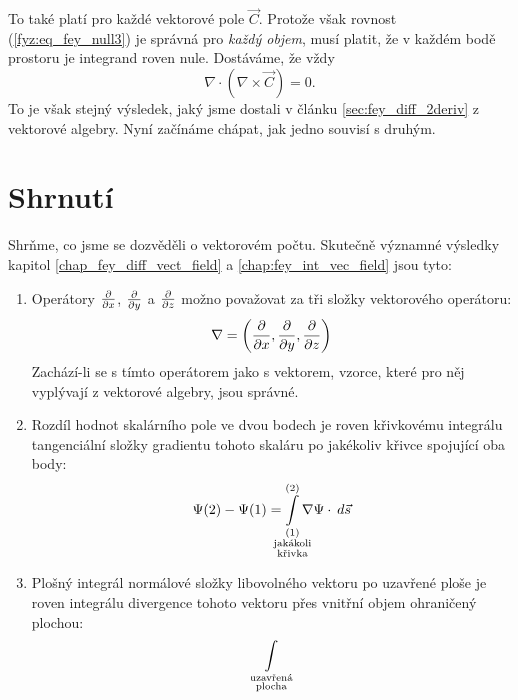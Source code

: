 {    To také platí pro každé vektorové pole \(\vec{C}\). Protože však rovnost 
    (\ref{fyz:eq_fey_null3}) je správná pro \emph{každý objem}, musí platit, že v každém bodě 
    prostoru je integrand roven nule. Dostáváme, že vždy
    \begin{equation}\label{fyz:eq_fey_null4}
     \nabla\cdot(\nabla\times\vec{C})=0.
    \end{equation}
    To je však stejný výsledek, jaký jsme dostali v článku \ref{sec:fey_diff_2deriv} z vektorové 
    algebry. Nyní začínáme chápat, jak jedno souvisí s druhým.      
 
  \section{Shrnutí}
    Shrňme, co jsme se dozvěděli o vektorovém počtu. Skutečně významné výsledky kapitol
    \ref{chap_fey_diff_vect_field} a \ref{chap:fey_int_vec_field} jsou tyto:
    \begin{enumerate}
      \item Operátory \(\frac{\partial  }{\partial x}\), \(\frac{\partial  }{\partial y}\) a  \(\frac{\partial  }{\partial z}\) možno považovat za tři
            složky vektorového operátoru:
            \begin{equation}
               \nabla = \left(\frac{\partial  }{\partial x}, \frac{\partial  }{\partial y}, \frac{\partial  }{\partial z}\right)
            \end{equation}
            Zachází-li se s tímto operátorem jako s vektorem, vzorce, které pro něj vyplývají z
            vektorové algebry, jsou správné.
      \item Rozdíl hodnot skalárního pole ve dvou bodech je roven křivkovému integrálu tangenciální
            složky gradientu tohoto skaláru po jakékoliv křivce spojující oba body:
            \begin{equation}
              \Psi(2)-\Psi(1) = 
                \limitint_{\mathclap{\substack{(1)\\\text{jakákoli}\\\text{křivka}}}}^{(2)}
                \nabla\Psi\cdot\dd{\vec{s}}
            \end{equation}
      \item Plošný integrál normálové složky libovolného vektoru po uzavřené ploše je roven 
            integrálu divergence tohoto vektoru přes vnitřní objem ohraničený plochou:
            \begin{equation}
              \limitint_{\mathclap{\substack{\text{uzavřená}\\\text{plocha}}}}          

\end{equation}
\end{enumerate}}
